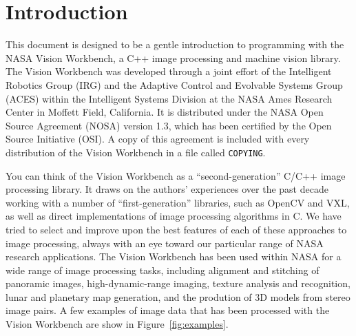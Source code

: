 \chapter{Introduction}

This document is designed to be a gentle introduction to programming
with the NASA Vision Workbench, a C++ image processing and machine
vision library.  The Vision Workbench was developed through a joint
effort of the Intelligent Robotics Group (IRG) and the Adaptive
Control and Evolvable Systems Group (ACES) within the Intelligent
Systems Division at the NASA Ames Research Center in Moffett Field,
California.  It is distributed under the NASA Open Source Agreement
(NOSA) version 1.3, which has been certified by the Open Source
Initiative (OSI).  A copy of this agreement is included with every
distribution of the Vision Workbench in a file called {\tt COPYING}.

You can think of the Vision Workbench as a ``second-generation'' C/C++
image processing library.  It draws on the authors' experiences over
the past decade working with a number of ``first-generation''
libraries, such as OpenCV and VXL, as well as direct implementations
of image processing algorithms in C.  We have tried to select and
improve upon the best features of each of these approaches to image
processing, always with an eye toward our particular range of NASA
research applications.  The Vision Workbench has been used within NASA
for a wide range of image processing tasks, including alignment and
stitching of panoramic images, high-dynamic-range imaging, texture
analysis and recognition, lunar and planetary map generation, and the
prodution of 3D models from stereo image pairs.  A few examples of
image data that has been processed with the Vision Workbench are show
in Figure~\ref{fig:examples}.

